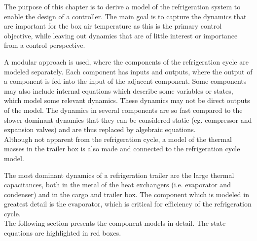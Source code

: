 The purpose of this chapter is to derive a model of the refrigeration system to enable the design of a controller. The main goal is to capture the dynamics that are important for the box air temperature as this is the primary control objective, while leaving out dynamics that are of little interest or importance from a control perspective.

A modular approach is used, where the components of the refrigeration cycle are modeled separately. Each component has inputs and outputs, where the output of a component is fed into the input of the adjacent component. Some components may also include internal equations which describe some variables or states, which model some relevant dynamics. These dynamics may not be direct outputs of the model. The dynamics in several components are so fast compared to the slower dominant dynamics that they can be considered static (eg. compressor and expansion valves) and are thus replaced by algebraic equations.\\


Although not apparent from the refrigeration cycle, a model of the thermal masses in the trailer box is also made and connected to the refrigeration cycle model.

The most dominant dynamics of a refrigeration trailer are the large thermal capacitances, both in the metal of the heat exchangers (i.e. evaporator and condenser) and in the cargo and trailer box. The component which is modeled in greatest detail is the evaporator, which is critical for efficiency of the refrigeration cycle. \\

The following section presents the component models in detail. The state equations are highlighted in red boxes.